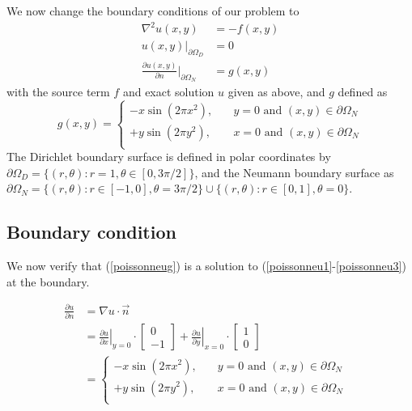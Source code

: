 \documentclass{report}
\begin{document}
We now change the boundary conditions of our problem to
\begin{align}
	\nabla^2 u(x,y) &= -f(x,y) \label{poissonneu1} \\
	u(x,y)|_{\partial\Omega_D} &= 0 \label{poissonneu2} \\
	\frac{\partial u(x,y)}{\partial n}|_{\partial \Omega_N} &= g(x,y) \label{poissonneu3}
\end{align}
with the source term $f$ and exact solution $u$ given as above, and $g$ defined as
\begin{equation} \label{poissonneug}
	g(x,y) = 
	\begin{cases}
	-x \sin (2 \pi x^2), & \quad y=0 \text{ and } (x,y) \in \partial \Omega_N \\
	+y \sin (2 \pi y^2), & \quad x=0 \text{ and } (x,y) \in \partial \Omega_N \\
	\end{cases}
\end{equation}
The Dirichlet boundary surface is defined in polar coordinates by $\partial \Omega_D = \{(r, \theta) : r = 1, \theta \in [0, 3 \pi /2]\}$, and the Neumann boundary surface as $\partial \Omega_N = \{(r, \theta) : r \in [-1,0], \theta = 3 \pi /2\} \cup \{(r, \theta) : r \in [0,1], \theta = 0\} $.

\subsection{Boundary condition}

We now verify that (\ref{poissonneug}) is a solution to (\ref{poissonneu1}-\ref{poissonneu3}) at the boundary.

\begin{align}
	\frac{\partial u}{\partial n} &= \nabla u \cdot \vec{n} \\
	&= \left.\frac{\partial u}{\partial x}\right|_{y=0} \cdot
	\begin{bmatrix}
		0 \\
		-1
	\end{bmatrix}
	+ \left.\frac{\partial u}{\partial y}\right|_{x=0} \cdot
	\begin{bmatrix}
		1\\
		0
	\end{bmatrix}
	& \\
	& = 
	\begin{cases}
		-x \sin (2 \pi x^2), & \quad y=0 \text{ and } (x,y) \in \partial \Omega_N \\
		+y \sin (2 \pi y^2), & \quad x=0 \text{ and } (x,y) \in \partial \Omega_N \\
	\end{cases}
\end{align}
\end{document}
